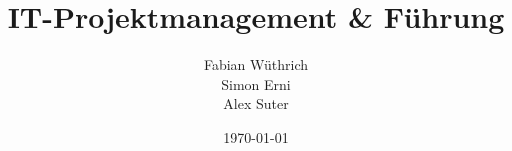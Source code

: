 \titlehead{Hochschule Luzern \\ 
	Technik \& Architektur}
\subject{Zusammenfassung}
\title{IT-Projektmanagement \& Führung}
\subtitle{}
\author{Fabian Wüthrich \\ 
	Simon Erni \\ 
	Alex Suter}
\date{\today}

\maketitle